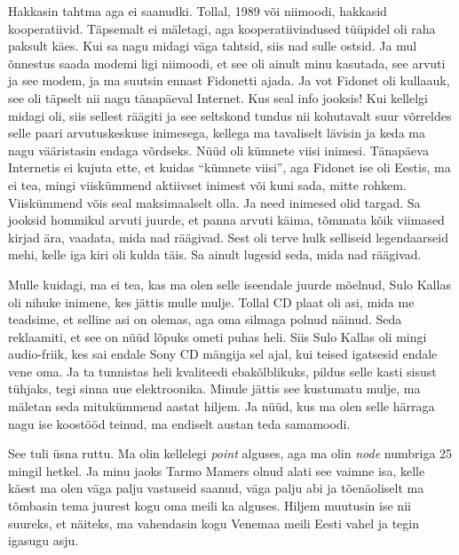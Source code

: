 Hakkasin tahtma aga ei saanudki. Tollal, 1989 või niimoodi, hakkasid kooperatiivid. Täpsemalt ei mäletagi, aga  kooperatiivindused tüüpidel oli raha paksult käes. Kui sa nagu midagi väga tahtsid, siis nad sulle ostsid. Ja mul õnnestus saada modemi ligi niimoodi, et see oli ainult minu kasutada, see arvuti ja see modem, ja ma suutsin ennast Fidonetti ajada. Ja vot Fidonet oli kullaauk, see oli täpselt nii nagu tänapäeval Internet. Kus seal info jooksis! Kui kellelgi midagi oli, siis sellest räägiti ja see seltskond tundus nii kohutavalt suur võrreldes selle paari arvutuskeskuse inimesega, kellega ma tavaliselt lävisin ja keda ma nagu  vääristasin endaga võrdseks. Nüüd oli kümnete viisi inimesi. Tänapäeva Internetis ei kujuta ette, et kuidas \enquote{kümnete viisi},  aga Fidonet ise oli Eestis, ma ei tea, mingi viiskümmend aktiivset inimest või kuni sada, mitte rohkem. Viiskümmend võis seal maksimaalselt olla. Ja need inimesed olid targad. Sa jooksid hommikul arvuti juurde, et panna arvuti käima, tõmmata kõik viimased kirjad ära, vaadata, mida nad räägivad. Sest oli terve hulk selliseid legendaarseid mehi, kelle iga kiri oli kulda täis. Sa ainult lugesid seda, mida nad räägivad. 


Mulle kuidagi, ma ei tea, kas ma olen selle iseendale juurde mõelnud, Sulo Kallas oli nihuke inimene, kes jättis mulle mulje. Tollal CD plaat oli asi, mida me teadsime, et selline asi on olemas, aga oma silmaga polnud näinud. Seda reklaamiti, et  see on nüüd lõpuks ometi puhas heli. Siis Sulo Kallas oli mingi audio-friik, kes sai endale Sony CD mängija sel ajal, kui teised igatsesid endale vene oma. Ja  ta tunnistas heli kvaliteedi ebakõlblikuks, pildus selle kasti sisust tühjaks, tegi sinna uue elektroonika. Minule jättis see kustumatu mulje, ma mäletan seda mitukümmend aastat hiljem. Ja nüüd, kus ma olen selle härraga nagu ise koostööd teinud, ma endiselt austan teda samamoodi. 


See tuli üsna ruttu. Ma olin kellelegi \emph{point} alguses, aga ma olin  \emph{node} numbriga 25 mingil hetkel. Ja minu jaoks Tarmo Mamers olnud alati see vaimne isa, kelle käest ma olen väga palju vastuseid saanud, väga palju abi ja tõenäoliselt ma tõmbasin tema juurest kogu oma meili ka alguses. Hiljem muutusin ise nii suureks, et näiteks, ma vahendasin kogu Venemaa meili Eesti vahel ja tegin igasugu asju. 


